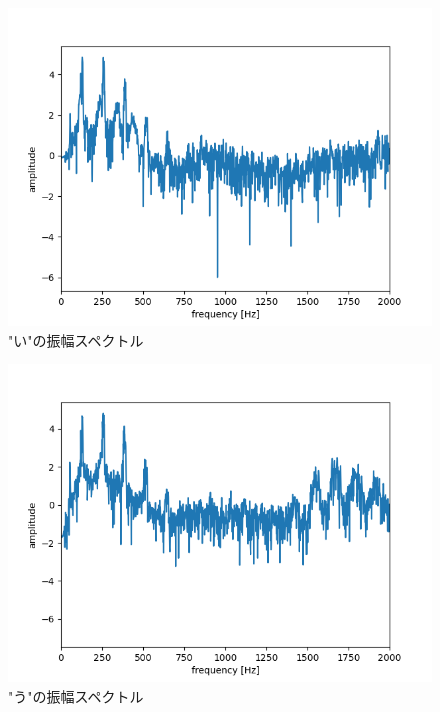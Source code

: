 \documentclass[a4paper,11pt]{jsarticle}
\begin{document}
\begin{figure}[H]
  \centering
  \includegraphics[scale=0.5]{../ex02/img/plot-spectrum-2000_i.png}
  \caption{"い"の振幅スペクトル}
  \label{spectrum_i}
\end{figure}

\begin{figure}[H]
  \centering
  \includegraphics[scale=0.5]{../ex02/img/plot-spectrum-2000_u.png}
  \caption{"う"の振幅スペクトル}
  \label{spectrum_u}
\end{figure}
\end{document}
